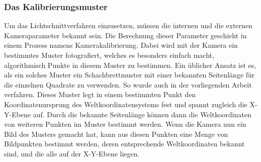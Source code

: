 \subsubsection{Das Kalibrierungsmuster}
Um das Lichtschnittverfahren einzusetzen, müssen die internen und die externen Kameraparameter bekannt sein. Die Berechnung dieser Parameter geschieht in einem Prozess namens Kamerakalibrierung. Dabei wird mit der Kamera ein bestimmtes Muster fotografiert, welches es besonders einfach macht, algorithmisch Punkte in diesem Muster zu bestimmen. Ein üblicher Ansatz ist es, als ein solches Muster ein Schachbrettmuster mit einer bekannten Seitenlänge für die einzelnen Quadrate zu verwenden. So wurde auch in der vorliegenden Arbeit verfahren. Dieses Muster legt in einem bestimmten Punkt den Koordinatenursprung des Weltkoordinatensystems fest und spannt zugleich die X-Y-Ebene auf. Durch die bekannte Seitenlänge können dann die Weltkoordinaten von weiteren Punkten im Muster bestimmt werden. Wenn die Kamera nun ein Bild des Musters gemacht hat, kann aus diesen Punkten eine Menge von Bildpunkten bestimmt werden, deren entsprechende Weltkoordinaten bekannt sind, und die alle auf der X-Y-Ebene liegen. 

